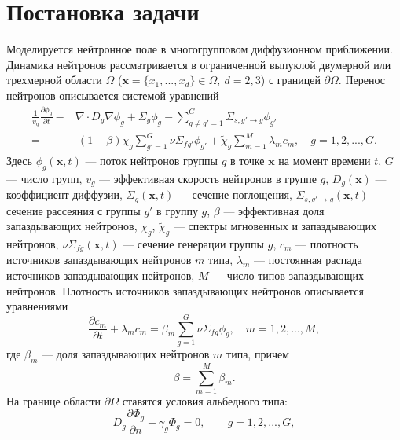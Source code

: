 \graphicspath{{./figs/}}
\newcommand{\norm}[1]{\left\lVert#1\right\rVert}
\section{Постановка задачи}

Моделируется нейтронное поле в многогрупповом диффузионном приближении. Динамика нейтронов 
рассматривается в ограниченной выпуклой двумерной или трехмерной области  $\Omega$ ($\bm x = \{x_1, ..., x_d\} \in \Omega, \ d = 2,3$) с границей $\partial \Omega$. Перенос нейтронов описывается системой уравнений
\begin{equation}\label{1}
\begin{split}
 \frac{1}{v_g} \frac{\partial \phi_g}{\partial t} - & \nabla \cdot D_g \nabla \phi_g + \Sigma_g \phi_g 
 - \sum_{g\neq g'=1}^{G} \Sigma_{s,g'\rightarrow g} \phi_{g'} \\
 =  & \ (1-\beta) \chi_g \sum_{g'=1}^{G} \nu \Sigma_{fg'} \phi_{g'} + \widetilde{\chi}_g \sum_{m=1}^{M} \lambda_m c_m , \quad 
 g = 1,2, ..., G .
\end{split}
\end{equation} 
Здесь $\phi_g(\bm x,t)$ --- поток нейтронов группы $g$ в точке $\bm x$ на момент времени $t$,
$G$ --- число групп,
$v_g$ --- эффективная скорость нейтронов в группе $g$,
$D_g(\bm x)$ --- коэффициент диффузии, $\Sigma_g(\bm x,t)$ --- сечение поглощения,
$\Sigma_{s,g'\rightarrow g}(\bm x,t)$ --- сечение рассеяния с группы $g'$ в группу $g$,
$\beta$ --- эффективная доля запаздывающих нейтронов, $\chi_g$, $\widetilde{\chi}_g$  --- спектры мгновенных и запаздывающих нейтронов, 
$\nu\Sigma_{fg}(\bm x,t)$ --- сечение генерации группы $g$,
$c_m$ --- плотность источников запаздывающих нейтронов $m$ типа,  $\lambda_m$ --- постоянная распада источников запаздывающих нейтронов,
$M$ --- число типов запаздывающих нейтронов.
Плотность источников запаздывающих нейтронов описывается уравнениями
\begin{equation}\label{2}
 \frac{\partial c_m}{\partial t} + \lambda_m c_m = \beta_m \sum_{g=1}^{G} \nu \Sigma_{fg} \phi_g,
 \quad m = 1,2, ..., M, 
\end{equation} 
где $\beta_m$ --- доля запаздывающих нейтронов  $m$ типа, причем
\[
 \beta = \sum_{m=1}^{M} \beta_m .
\] 
На границе области $\partial \Omega$ ставятся условия альбедного типа:
\begin{equation}\label{3}
 D_g\frac{\partial \Phi_g}{\partial n} + \gamma_g \Phi_g = 0, \quad 
 \quad g = 1,2, ..., G ,
\end{equation}
